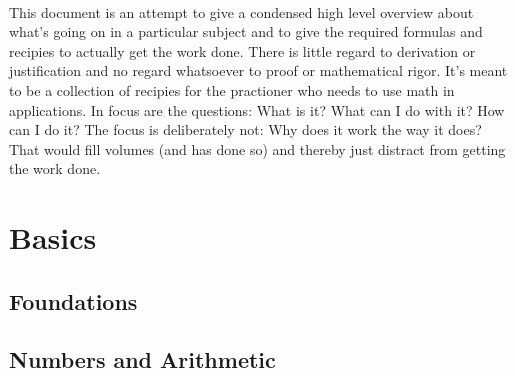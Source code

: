 \documentclass[12pt]{article}
\begin{document}
\paragraph{}
This document is an attempt to give a condensed high level overview about what's going on in a particular subject and to give the required formulas and recipies to actually get the work done. There is little regard to derivation or justification and no regard whatsoever to proof or mathematical rigor. It's meant to be a collection of recipies for the practioner who needs to use math in applications. In focus are the questions: What is it? What can I do with it? How can I do it? The focus is deliberately not: Why does it work the way it does? That would fill volumes (and has done so) and thereby just distract from getting the work done.

\section{Basics}
\subsection{Foundations} 
  
\subsection{Numbers and Arithmetic} 
 
\end{document}
